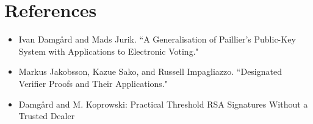 \documentclass{llncs}
\begin{document}

\section*{References}
\begin{itemize}
	\item Ivan Damgård and Mads Jurik. ``A Generalisation of Paillier’s Public-Key System with Applications to Electronic Voting."
	\item Markus Jakobsson, Kazue Sako, and Russell Impagliazzo. ``Designated Verifier Proofs and Their Applications."
	\item Damgård and M. Koprowski: Practical Threshold RSA Signatures Without a Trusted Dealer
\end{itemize}

%
%
\end{document}
